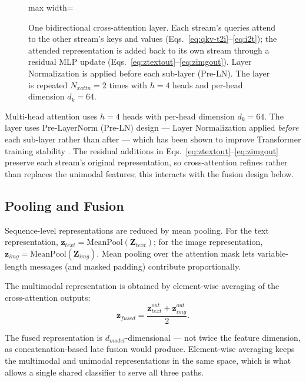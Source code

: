 \documentclass[10pt,twoside]{article}
\begin{document}
\begin{figure}[t]
\begin{adjustbox}{max width=\textwidth}
\end{adjustbox}
\caption{One bidirectional cross-attention layer. Each stream's queries attend to the other stream's keys and values (Eqs.~\eqref{eq:qkv-t2i}--\eqref{eq:i2t}); the attended representation is added back to its own stream through a residual MLP update (Eqs.~\eqref{eq:ztextout}--\eqref{eq:zimgout}). Layer Normalization is applied before each sub-layer (Pre-LN). The layer is repeated $N_{xattn} = 2$ times with $h = 4$ heads and per-head dimension $d_k = 64$.}
\label{fig:crossattention}
\end{figure}

Multi-head attention uses $h = 4$ heads with per-head dimension $d_k = 64$. The layer uses Pre-LayerNorm (Pre-LN) design --- Layer Normalization applied \emph{before} each sub-layer rather than after --- which has been shown to improve Transformer training stability \citep{xiong2020layernorm}. The residual additions in Eqs.~\eqref{eq:ztextout}--\eqref{eq:zimgout} preserve each stream's original representation, so cross-attention refines rather than replaces the unimodal features; this interacts with the fusion design below.

\subsection{Pooling and Fusion}\label{sec:pooling}

Sequence-level representations are reduced by mean pooling. For the text representation, $\mathbf{z}_{text} = \text{MeanPool}(\mathbf{Z}_{text})$; for the image representation, $\mathbf{z}_{img} = \text{MeanPool}(\mathbf{Z}_{img})$. Mean pooling over the attention mask lets variable-length messages (and masked padding) contribute proportionally.

The multimodal representation is obtained by element-wise averaging of the cross-attention outputs:
\begin{equation}\label{eq:zfused}
\mathbf{z}_{fused} = \frac{\mathbf{z}_{text}^{out} + \mathbf{z}_{img}^{out}}{2}.
\end{equation}

The fused representation is $d_{model}$-dimensional --- not twice the feature dimension, as concatenation-based late fusion would produce. Element-wise averaging keeps the multimodal and unimodal representations in the same space, which is what allows a single shared classifier to serve all three paths.
\end{document}
